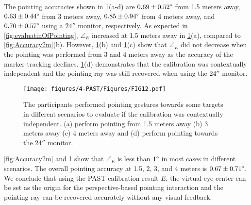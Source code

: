 The pointing accuracies shown in \figurename{ \ref{fig:Accuracy}(a-d)} are $0.69\pm0.52\degree$ from 1.5 meters away, $0.63\pm0.44\degree$ from 3 meters away, $0.85\pm0.94\degree$ from 4 meters away, and $0.70\pm0.57\degree$ using a $24''$ monitor, respectively. 
As expected in \figurename{ \ref{fig:evaluatinOfPointing}},  ${\angle}_{E}$ increased at 1.5 meters away in \figurename{ \ref{fig:Accuracy}(a)}, compared to \figurename{ \ref{fig:Accuracy2m}(b)}. However, \figurename{ \ref{fig:Accuracy}(b) and \ref{fig:Accuracy}(c)} show that ${\angle}_{E}$ did not decrease when the pointing was performed from 3 and 4 meters away as the accuracy of the marker tracking declines. \figurename{ \ref{fig:Accuracy}(d)} demonstrates that the calibration was contextually independent and the pointing ray was still recovered when using the 24$''$ monitor. 
\begin{figure} 
	\centering
	\texttt{[image: figures/4-PAST/Figures/FIG12.pdf]}
	\caption{The participants performed pointing gestures towards some targets in different scenarios to evaluate if the calibration was contextually independent. (a) perform pointing from 1.5 meters away (b) 3 meters away (c) 4 meters away and (d) perform pointing towards the 24$''$ monitor.}
	\label{fig:Accuracy}
\end{figure}

\figurename{ \ref{fig:Accuracy2m}} and \figurename{ \ref{fig:Accuracy}} show that ${\angle}_{E}$ is less than $1\degree$ in most cases in different scenarios. The overall pointing accuracy at 1.5, 2, 3, and 4 meters is $0.67\pm0.71\degree$. We conclude that using the PAST calibration result $E$, the virtual eye center can be set as the origin for the perspective-based pointing interaction and the pointing ray can be recovered accurately without any visual feedback.


